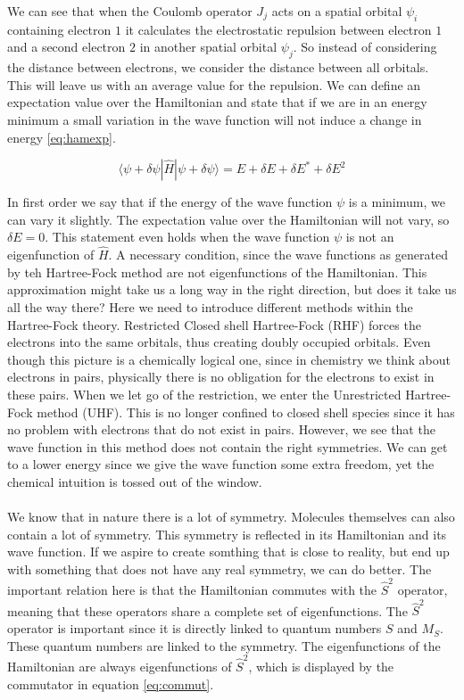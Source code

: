 \documentclass[twoside,twocolumn,9pt]{article}
\begin{document}
We can see that when the Coulomb operator $J_j$ acts on a spatial orbital $\psi_i$ containing electron $1$ it calculates the electrostatic repulsion between electron $1$ and a
second electron $2$ in another spatial orbital $\psi_j$. So instead of considering the distance between electrons, we consider the distance between all orbitals. This will leave us
with an average value for the repulsion.
We can define an expectation value over the Hamiltonian and state that if we are in an energy minimum a small variation in the wave function will not induce a change
in energy \eqref{eq:hamexp}.

\begin{equation}\label{eq:hamexp}
  \langle\psi + \delta\psi|\hat{H}|\psi + \delta\psi \rangle = E + \delta E + \delta E^* + \delta E^2
\end{equation}

In first order we say that if the energy of the wave function $\psi$ is a minimum, we can vary it slightly. The expectation value over the Hamiltonian will not vary,
so $\delta E = 0$. This statement even holds when the wave function $\psi$ is not an eigenfunction of $\hat{H}$. A necessary condition, since the wave functions as generated
by teh Hartree-Fock method are not eigenfunctions of the Hamiltonian.
This approximation might take us a long way in the right direction, but does it take us all the way there? Here we need to introduce different methods within the
Hartree-Fock theory. Restricted Closed shell Hartree-Fock (RHF) forces the electrons into the same orbitals, thus creating doubly occupied orbitals. Even though this
picture is a chemically logical one, since in chemistry we think about electrons in pairs, physically there is no obligation for the electrons to exist in these pairs.
When we let go of the restriction, we enter the Unrestricted Hartree-Fock method (UHF). This  is no longer confined to closed shell species since it has no problem with
electrons that do not exist in pairs. However, we see that the wave function in this method does not contain the right symmetries. We can get to a lower energy since we give
the wave function some extra freedom, yet the chemical intuition is tossed out of the window.
\paragraph*{}
We know that in nature there is a lot of symmetry. Molecules themselves can also contain a lot of symmetry. This symmetry is reflected in its Hamiltonian and its wave function.
If we aspire to create somthing that is close to reality, but end up with something that does not have any real symmetry, we can do better. The important relation here is that
the Hamiltonian commutes with the $\hat{S}^2$ operator, meaning that these operators share a complete set of eigenfunctions. The $\hat{S}^2$ operator is important since it is
directly linked to quantum numbers $S$ and $M_S$\cite{Acke2019}. These quantum numbers are linked to the symmetry. The eigenfunctions of the Hamiltonian are always eigenfunctions
of $\hat{S}^2$, which is displayed by the commutator in equation \eqref{eq:commut}.
\end{document}
